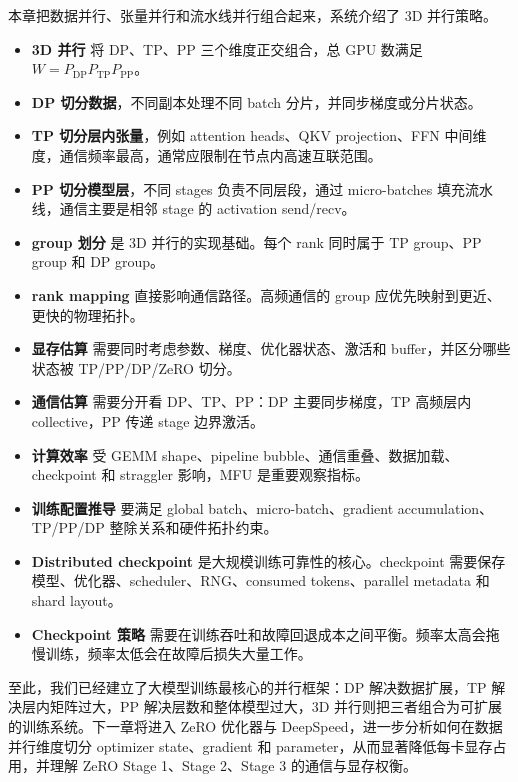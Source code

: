 本章把数据并行、张量并行和流水线并行组合起来，系统介绍了 3D 并行策略。

\begin{itemize}
\item \textbf{3D 并行} 将 DP、TP、PP 三个维度正交组合，总 GPU 数满足 $W=P_{\mathrm{DP}}P_{\mathrm{TP}}P_{\mathrm{PP}}$。
\item \textbf{DP 切分数据}，不同副本处理不同 batch 分片，并同步梯度或分片状态。
\item \textbf{TP 切分层内张量}，例如 attention heads、QKV projection、FFN 中间维度，通信频率最高，通常应限制在节点内高速互联范围。
\item \textbf{PP 切分模型层}，不同 stages 负责不同层段，通过 micro-batches 填充流水线，通信主要是相邻 stage 的 activation send/recv。
\item \textbf{group 划分} 是 3D 并行的实现基础。每个 rank 同时属于 TP group、PP group 和 DP group。
\item \textbf{rank mapping} 直接影响通信路径。高频通信的 group 应优先映射到更近、更快的物理拓扑。
\item \textbf{显存估算} 需要同时考虑参数、梯度、优化器状态、激活和 buffer，并区分哪些状态被 TP/PP/DP/ZeRO 切分。
\item \textbf{通信估算} 需要分开看 DP、TP、PP：DP 主要同步梯度，TP 高频层内 collective，PP 传递 stage 边界激活。
\item \textbf{计算效率} 受 GEMM shape、pipeline bubble、通信重叠、数据加载、checkpoint 和 straggler 影响，MFU 是重要观察指标。
\item \textbf{训练配置推导} 要满足 global batch、micro-batch、gradient accumulation、TP/PP/DP 整除关系和硬件拓扑约束。
\item \textbf{Distributed checkpoint} 是大规模训练可靠性的核心。checkpoint 需要保存模型、优化器、scheduler、RNG、consumed tokens、parallel metadata 和 shard layout。
\item \textbf{Checkpoint 策略} 需要在训练吞吐和故障回退成本之间平衡。频率太高会拖慢训练，频率太低会在故障后损失大量工作。
\end{itemize}

至此，我们已经建立了大模型训练最核心的并行框架：DP 解决数据扩展，TP 解决层内矩阵过大，PP 解决层数和整体模型过大，3D 并行则把三者组合为可扩展的训练系统。下一章将进入 ZeRO 优化器与 DeepSpeed，进一步分析如何在数据并行维度切分 optimizer state、gradient 和 parameter，从而显著降低每卡显存占用，并理解 ZeRO Stage 1、Stage 2、Stage 3 的通信与显存权衡。
